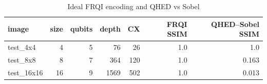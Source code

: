 
\begin{table}[htbp]
\centering
\caption{Ideal FRQI encoding and QHED vs Sobel}
\label{tab:encoding_baseline}
\begin{tabular}{lrrrrrr}
\toprule
image & size & qubits & depth & CX & FRQI SSIM & QHED--Sobel SSIM \\
\midrule
test\_4x4 & 4 & 5 & 76 & 26 & 1.0 & 1.0 \\
test\_8x8 & 8 & 7 & 364 & 120 & 1.0 & 0.163 \\
test\_16x16 & 16 & 9 & 1569 & 502 & 1.0 & 0.013 \\
\bottomrule
\end{tabular}
\end{table}
